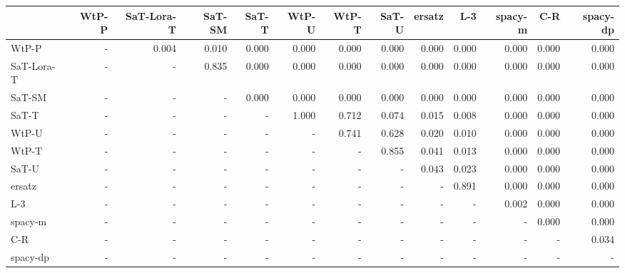 \begin{tabular}{lrrrrrrrrrrrr}
\toprule
 & WtP-P & SaT-Lora-T & SaT-SM & SaT-T & WtP-U & WtP-T & SaT-U & ersatz & L-3 & spacy-m & C-R & spacy-dp \\
\midrule
WtP-P & - & 0.004 & 0.010 & 0.000 & 0.000 & 0.000 & 0.000 & 0.000 & 0.000 & 0.000 & 0.000 & 0.000 \\
SaT-Lora-T & - & - & 0.835 & 0.000 & 0.000 & 0.000 & 0.000 & 0.000 & 0.000 & 0.000 & 0.000 & 0.000 \\
SaT-SM & - & - & - & 0.000 & 0.000 & 0.000 & 0.000 & 0.000 & 0.000 & 0.000 & 0.000 & 0.000 \\
SaT-T & - & - & - & - & 1.000 & 0.712 & 0.074 & 0.015 & 0.008 & 0.000 & 0.000 & 0.000 \\
WtP-U & - & - & - & - & - & 0.741 & 0.628 & 0.020 & 0.010 & 0.000 & 0.000 & 0.000 \\
WtP-T & - & - & - & - & - & - & 0.855 & 0.041 & 0.013 & 0.000 & 0.000 & 0.000 \\
SaT-U & - & - & - & - & - & - & - & 0.043 & 0.023 & 0.000 & 0.000 & 0.000 \\
ersatz & - & - & - & - & - & - & - & - & 0.891 & 0.000 & 0.000 & 0.000 \\
L-3 & - & - & - & - & - & - & - & - & - & 0.002 & 0.000 & 0.000 \\
spacy-m & - & - & - & - & - & - & - & - & - & - & 0.000 & 0.000 \\
C-R & - & - & - & - & - & - & - & - & - & - & - & 0.034 \\
spacy-dp & - & - & - & - & - & - & - & - & - & - & - & - \\
\bottomrule
\end{tabular}

